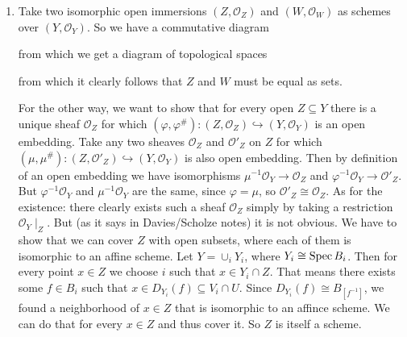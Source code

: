 \begin{exercise}{2}
    \begin{enumerate}
        \item{Take two isomorphic open immersions $(Z, \mathcal{O}_Z)$ and $(W,
            \mathcal{O}_W)$ as schemes over $(Y, \mathcal{O}_Y)$. So we have a
            commutative diagram


            from which we get a diagram of topological spaces


            from which it clearly follows that $Z$ and $W$ must be equal as
            sets.

            For the other way, we want to show that for every open $Z \subseteq
            Y$ there is a unique sheaf $\mathcal{O}_Z$ for which $(\varphi,
            \varphi^\#) \colon (Z, \mathcal{O}_Z) \hookrightarrow (Y,
            \mathcal{O}_Y)$ is an open embedding. Take any two sheaves
            $\mathcal{O}_Z$ and $\mathcal{O}'_Z$ on $Z$ for which $(\mu, \mu^\#)
            \colon (Z, \mathcal{O}'_Z) \hookrightarrow (Y, \mathcal{O}_Y)$ is
            also open embedding. Then by definition of an open embedding we have
            isomorphisms $\mu^{-1}\mathcal{O}_Y \rightarrow \mathcal{O}_Z$ and
            $\varphi^{-1}\mathcal{O}_Y \rightarrow \mathcal{O}'_Z$. But
            $\varphi^{-1}\mathcal{O}_Y$ and $\mu^{-1}\mathcal{O}_Y$ are the
            same, since $\varphi = \mu$, so $\mathcal{O}'_Z \cong
            \mathcal{O}_Z$. As for the existence: there clearly exists such a
            sheaf $\mathcal{O}_Z$ simply by taking a restriction
            $\mathcal{O}_Y\mid_Z$. But (as it says in Davies/Scholze notes) it
            is not obvious. We have to show that we can cover $Z$ with open
            subsets, where each of them is isomorphic to an affine scheme. Let
            $Y = \cup_i Y_i$, where $Y_i \cong \operatorname{Spec} B_i$. Then for every point
            $x \in Z$ we choose $i$ such that $x \in Y_i \cap Z$. That means
            there exists some $f \in B_i$ such that $x \in D_{Y_i}(f) \subseteq
            V_i \cap U$. Since $D_{Y_i}(f) \cong B_[f^{-1}]$, we found a
            neighborhood of $x \in Z$ that is isomorphic to an affince scheme.
            We can do that for every $x \in Z$ and thus cover it. So $Z$ is
            itself a scheme.
            }
    \end{enumerate}
\end{exercise}

